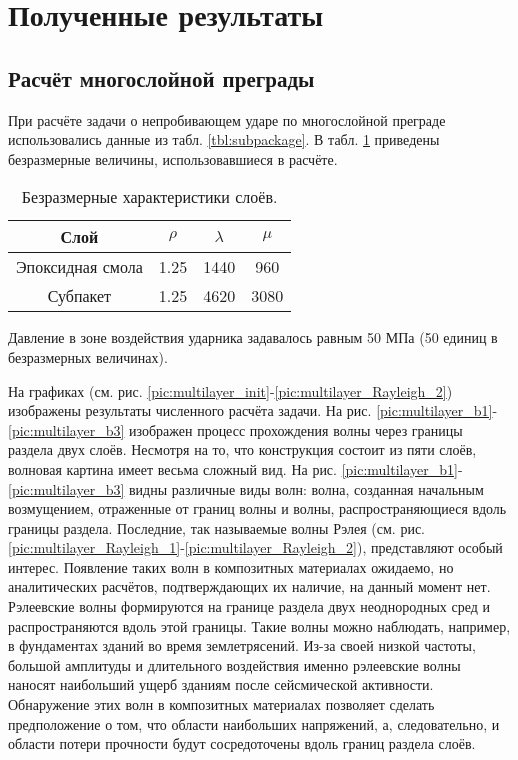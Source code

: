 \section{Полученные результаты}

\subsection{Расчёт многослойной преграды}
При расчёте задачи о непробивающем ударе по многослойной преграде использовались
данные из табл. \ref{tbl:subpackage}. В табл. \ref{tbl:subpackage_2} приведены
безразмерные величины, использовавшиеся в расчёте.
\begin{table}[h]
\centering
\begin{tabular}{|c|c|c|c|}
\hline
Слой & $\rho$ & $\lambda$ & $\mu$  \\
\hline
Эпоксидная смола & 1.25 & 1440 & 960 \\
Субпакет & 1.25 & 4620 & 3080 \\
\hline
\end{tabular}
\caption{Безразмерные характеристики слоёв.}
\label{tbl:subpackage_2}
\end{table}

Давление в зоне воздействия ударника задавалось равным 50 МПа (50 единиц в безразмерных величинах).

На графиках (см. рис. \ref{pic:multilayer_init}-\ref{pic:multilayer_Rayleigh_2})
изображены результаты численного расчёта задачи.
На рис. \ref{pic:multilayer_b1}-\ref{pic:multilayer_b3} изображен процесс
прохождения волны через границы раздела двух слоёв. Несмотря на то, что
конструкция состоит из пяти слоёв, волновая картина имеет весьма сложный
вид. На рис. \ref{pic:multilayer_b1}-\ref{pic:multilayer_b3} видны различные
виды волн: волна, созданная начальным возмущением, отраженные от границ волны и
волны, распространяющиеся вдоль границы раздела. Последние, так называемые волны
Рэлея (см. рис. \ref{pic:multilayer_Rayleigh_1}-\ref{pic:multilayer_Rayleigh_2}), 
представляют особый интерес. Появление таких волн в композитных материалах
ожидаемо, но аналитических расчётов, подтверждающих их наличие, на данный момент
нет. Рэлеевские волны формируются на границе раздела двух неоднородных сред и
распространяются вдоль этой границы. Такие волны можно наблюдать, например, в фундаментах
зданий во время землетрясений. Из-за своей низкой частоты, большой
амплитуды и длительного воздействия именно рэлеевские волны наносят наибольший
ущерб зданиям после сейсмической активности. Обнаружение этих волн в композитных
материалах позволяет сделать предположение о том, что области наибольших
напряжений, а, следовательно, и области потери прочности будут сосредоточены
вдоль границ раздела слоёв.

